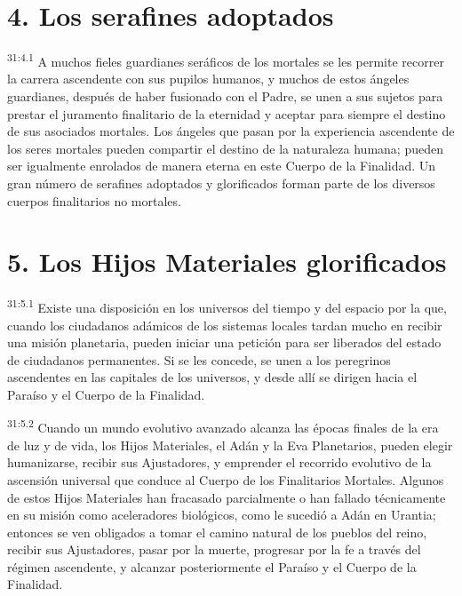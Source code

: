 \section*{4. Los serafines adoptados}
\par
\textsuperscript{31:4.1} A muchos fieles guardianes seráficos de los mortales se les permite recorrer la carrera ascendente con sus pupilos humanos, y muchos de estos ángeles guardianes, después de haber fusionado con el Padre, se unen a sus sujetos para prestar el juramento finalitario de la eternidad y aceptar para siempre el destino de sus asociados mortales. Los ángeles que pasan por la experiencia ascendente de los seres mortales pueden compartir el destino de la naturaleza humana; pueden ser igualmente enrolados de manera eterna en este Cuerpo de la Finalidad. Un gran número de serafines adoptados y glorificados forman parte de los diversos cuerpos finalitarios no mortales.

\section*{5. Los Hijos Materiales glorificados}
\par
\textsuperscript{31:5.1} Existe una disposición en los universos del tiempo y del espacio por la que, cuando los ciudadanos adámicos de los sistemas locales tardan mucho en recibir una misión planetaria, pueden iniciar una petición para ser liberados del estado de ciudadanos permanentes. Si se les concede, se unen a los peregrinos ascendentes en las capitales de los universos, y desde allí se dirigen hacia el Paraíso y el Cuerpo de la Finalidad.

\par
\textsuperscript{31:5.2} Cuando un mundo evolutivo avanzado alcanza las épocas finales de la era de luz y de vida, los Hijos Materiales, el Adán y la Eva Planetarios, pueden elegir humanizarse, recibir sus Ajustadores, y emprender el recorrido evolutivo de la ascensión universal que conduce al Cuerpo de los Finalitarios Mortales. Algunos de estos Hijos Materiales han fracasado parcialmente o han fallado técnicamente en su misión como aceleradores biológicos, como le sucedió a Adán en Urantia; entonces se ven obligados a tomar el camino natural de los pueblos del reino, recibir sus Ajustadores, pasar por la muerte, progresar por la fe a través del régimen ascendente, y alcanzar posteriormente el Paraíso y el Cuerpo de la Finalidad.

